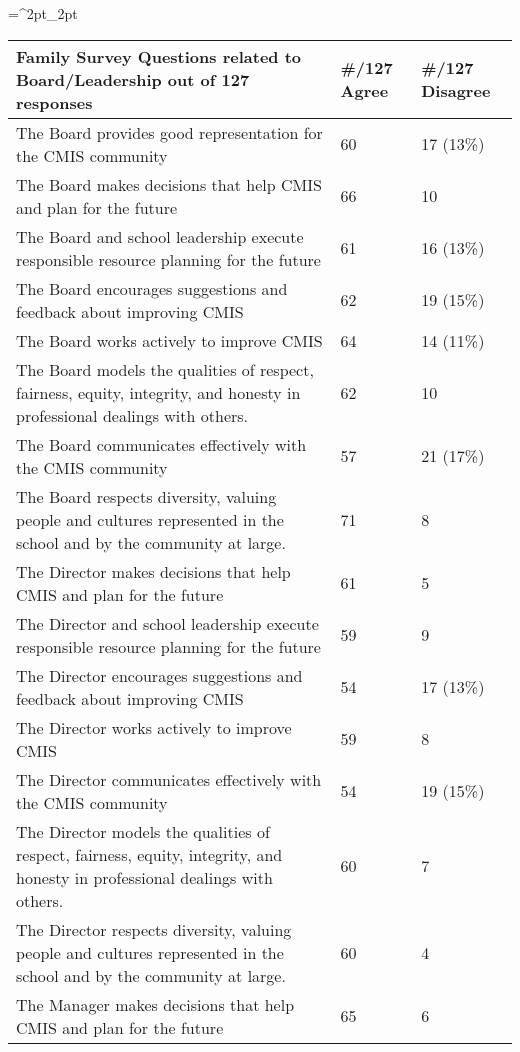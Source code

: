 \begin{table}[H]
\tiny
\caption{Family Survey of Board/Leadership}
\label{table:14}
\tabulinesep=^2pt_2pt
\begin{longtabu}{|X[8]|X|X|}
\hline
Family Survey Questions related to Board/Leadership out of 127 responses &
\#/127 Agree &
\#/127 Disagree \\
\hline
The Board provides good representation for the CMIS community &
60 &
17 (13\%) \\
\hline
The Board makes decisions that help CMIS and plan for the future &
66 &
10 \\
\hline
The Board and school leadership execute responsible resource planning for the future &
61 &
16 (13\%) \\
\hline
The Board encourages suggestions and feedback about improving CMIS &
62 &
19 (15\%) \\
\hline
The Board works actively to improve CMIS &
64 &
14 (11\%) \\
\hline
The Board models the qualities of respect, fairness, equity, integrity, and honesty in professional dealings with others. &
62 &
10 \\
\hline
The Board communicates effectively with the CMIS community &
57 &
21 (17\%) \\
\hline
The Board respects diversity, valuing people and cultures represented in the school and by the community at large. &
71 &
8 \\
\hline
The Director makes decisions that help CMIS and plan for the future &
61 &
5 \\
\hline
The Director and school leadership execute responsible resource planning for the future &
59 &
9 \\
\hline
The Director encourages suggestions and feedback about improving CMIS &
54 &
17 (13\%) \\
\hline
The Director works actively to improve CMIS &
59 &
8 \\
\hline
The Director communicates effectively with the CMIS community &
54 &
19 (15\%) \\
\hline
The Director models the qualities of respect, fairness, equity, integrity, and honesty in professional dealings with others. &
60 &
7 \\
\hline
The Director respects diversity, valuing people and cultures represented in the school and by the community at large. &
60 &
4 \\
\hline
The Manager makes decisions that help CMIS and plan for the future &
65 &
6 \\

\end{longtabu}
\end{table}
